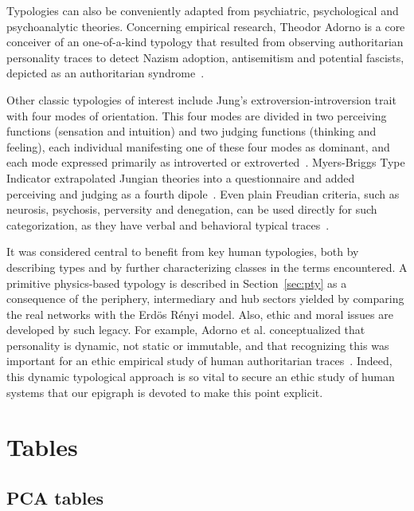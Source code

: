 \documentclass[%
 aip,
 jmp,%
 amsmath,amssymb,
 reprint,%
]{revtex4-1}
\begin{document}
Typologies can also be conveniently adapted from psychiatric, psychological and psychoanalytic theories.
Concerning empirical research,
Theodor Adorno is a core conceiver of an one-of-a-kind typology that resulted from observing authoritarian
personality traces to detect Nazism adoption, antisemitism and potential fascists, depicted as an authoritarian syndrome~\cite{adorno}.

Other classic typologies of interest include Jung's extroversion-introversion trait with four modes of orientation. This four modes are divided in two perceiving functions (sensation and intuition) and two judging functions (thinking and feeling), each individual manifesting one of these four modes as dominant, and each mode expressed primarily as introverted or extroverted~\cite{jung}. Myers-Briggs Type Indicator extrapolated Jungian theories into a questionnaire and added perceiving and judging as a fourth dipole~\cite{myers}. Even plain Freudian criteria, such as neurosis, psychosis, perversity and denegation, can be used directly for such categorization, as they have verbal and behavioral typical traces~\cite{freud,freud2}.

It was considered central to benefit from key human typologies, both by describing types and by further characterizing classes in the terms encountered. A primitive physics-based typology is described in Section~\ref{sec:pty} as a consequence of the periphery, intermediary and hub sectors yielded by comparing the real networks with the Erd\"os R\'enyi model.
Also, ethic and moral issues are developed by such legacy. For example, Adorno et al. conceptualized that personality is dynamic, not static or immutable, and that recognizing this was important for an ethic empirical study of human authoritarian traces~\cite{adorno}.
Indeed, this dynamic typological approach is so vital to secure an ethic study of human systems that our epigraph is devoted to make this point explicit.

\section{Tables}\label{sectables}
\clearpage
\subsection{PCA tables}\label{sec:pcat}
\end{document}
